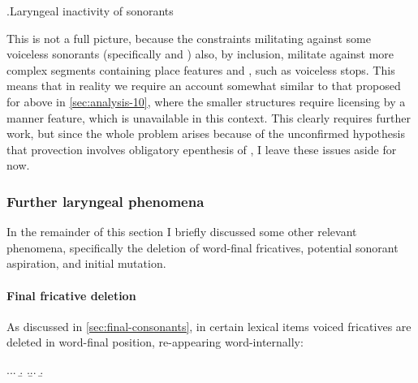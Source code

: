 \ex.\label{tbl:gwndwn-pentan}Laryngeal inactivity of sonorants\\

This is not a full picture, because the constraints militating against some voiceless sonorants (specifically \ipa{[m̥\kern1pt]} and \ipa{[r̥]}) also, by inclusion, militate against more complex segments containing place features and , such as voiceless stops. This means that in reality we require an account somewhat similar to that proposed for \ipa{[h]} above in \cref{sec:analysis-10}, where the smaller structures require licensing by a manner feature, which is unavailable in this context. This clearly requires further work, but since the whole problem arises because of the unconfirmed hypothesis that provection involves obligatory epenthesis of , I leave these issues aside for now.

\subsubsection{Further laryngeal phenomena}
\label{sec:furth-laryng-phen}

In the remainder of this section I briefly discussed some other relevant phenomena, specifically the deletion of word-final fricatives, potential sonorant aspiration, and initial mutation.

\paragraph{Final fricative deletion}
\label{sec:final-fric-delet}

As discussed in \cref{sec:final-consonants}, in certain lexical items voiced fricatives \ipa{[v~ð]} are deleted in word-final position, re-appearing word-internally:

\ex.\a.\a.
\b.
\z.\b.\a.
\b.

